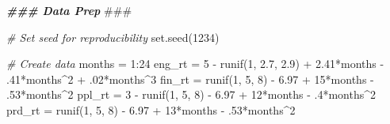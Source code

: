 \documentclass[
]{book}
\newenvironment{Shaded}{\begin{snugshade}}{\end{snugshade}}
\newcommand{\AlertTok}[1]{\textcolor[rgb]{0.94,0.16,0.16}{#1}}
\newcommand{\CommentTok}[1]{\textcolor[rgb]{0.56,0.35,0.01}{\textit{#1}}}
\newcommand{\DecValTok}[1]{\textcolor[rgb]{0.00,0.00,0.81}{#1}}
\newcommand{\DocumentationTok}[1]{\textcolor[rgb]{0.56,0.35,0.01}{\textbf{\textit{#1}}}}
\newcommand{\FloatTok}[1]{\textcolor[rgb]{0.00,0.00,0.81}{#1}}
\newcommand{\FunctionTok}[1]{\textcolor[rgb]{0.00,0.00,0.00}{#1}}
\newcommand{\NormalTok}[1]{#1}
\newcommand{\OtherTok}[1]{\textcolor[rgb]{0.56,0.35,0.01}{#1}}
\newcommand{\SpecialCharTok}[1]{\textcolor[rgb]{0.00,0.00,0.00}{#1}}
\begin{document}
\begin{Shaded}
\begin{Highlighting}[]
\DocumentationTok{\#\#\# Data Prep }\AlertTok{\#\#\#}

\CommentTok{\# Set seed for reproducibility}
\FunctionTok{set.seed}\NormalTok{(}\DecValTok{1234}\NormalTok{)}

\CommentTok{\# Create data}
\NormalTok{months }\OtherTok{=} \DecValTok{1}\SpecialCharTok{:}\DecValTok{24}
\NormalTok{eng\_rt }\OtherTok{=} \DecValTok{5} \SpecialCharTok{{-}} \FunctionTok{runif}\NormalTok{(}\DecValTok{1}\NormalTok{, }\FloatTok{2.7}\NormalTok{, }\FloatTok{2.9}\NormalTok{) }\SpecialCharTok{+} \FloatTok{2.41}\SpecialCharTok{*}\NormalTok{months }\SpecialCharTok{{-}}\NormalTok{ .}\DecValTok{41}\SpecialCharTok{*}\NormalTok{months}\SpecialCharTok{\^{}}\DecValTok{2} \SpecialCharTok{+}\NormalTok{ .}\DecValTok{02}\SpecialCharTok{*}\NormalTok{months}\SpecialCharTok{\^{}}\DecValTok{3}
\NormalTok{fin\_rt }\OtherTok{=} \FunctionTok{runif}\NormalTok{(}\DecValTok{1}\NormalTok{, }\DecValTok{5}\NormalTok{, }\DecValTok{8}\NormalTok{) }\SpecialCharTok{{-}} \FloatTok{6.97} \SpecialCharTok{+} \DecValTok{15}\SpecialCharTok{*}\NormalTok{months }\SpecialCharTok{{-}}\NormalTok{ .}\DecValTok{53}\SpecialCharTok{*}\NormalTok{months}\SpecialCharTok{\^{}}\DecValTok{2}
\NormalTok{ppl\_rt }\OtherTok{=} \DecValTok{3} \SpecialCharTok{{-}} \FunctionTok{runif}\NormalTok{(}\DecValTok{1}\NormalTok{, }\DecValTok{5}\NormalTok{, }\DecValTok{8}\NormalTok{) }\SpecialCharTok{{-}} \FloatTok{6.97} \SpecialCharTok{+} \DecValTok{12}\SpecialCharTok{*}\NormalTok{months }\SpecialCharTok{{-}}\NormalTok{ .}\DecValTok{4}\SpecialCharTok{*}\NormalTok{months}\SpecialCharTok{\^{}}\DecValTok{2}
\NormalTok{prd\_rt }\OtherTok{=} \FunctionTok{runif}\NormalTok{(}\DecValTok{1}\NormalTok{, }\DecValTok{5}\NormalTok{, }\DecValTok{8}\NormalTok{) }\SpecialCharTok{{-}} \FloatTok{6.97} \SpecialCharTok{+} \DecValTok{13}\SpecialCharTok{*}\NormalTok{months }\SpecialCharTok{{-}}\NormalTok{ .}\DecValTok{53}\SpecialCharTok{*}\NormalTok{months}\SpecialCharTok{\^{}}\DecValTok{2}


\end{Highlighting}
\end{Shaded}
\end{document}
